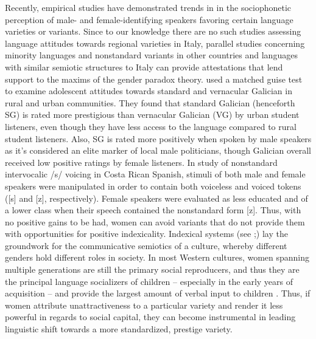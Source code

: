 \documentclass[output=paper,colorlinks,citecolor=brown]{langscibook}
\begin{document}
\par Recently, empirical studies have demonstrated trends in in the sociophonetic perception of male- and female-identifying speakers favoring certain language varieties or variants. Since to our knowledge there are no such studies assessing language attitudes towards regional varieties in Italy, parallel studies concerning minority languages and nonstandard variants in other countries and languages with similar semiotic structures to Italy can provide attestations that lend support to the maxims of the gender paradox theory. \cite{lour13} used a matched guise test to examine adolescent attitudes towards standard and vernacular Galician in rural and urban communities. They found that standard Galician (henceforth SG) is rated more prestigious than vernacular Galician (VG) by urban student listeners, even though they have less access to the language compared to rural student listeners. Also, SG is rated more positively when spoken by male speakers as it’s considered an elite marker of local male politicians, though Galician overall received low positive ratings by female listeners. In \cite{chap16} study of nonstandard intervocalic /s/ voicing in Costa Rican Spanish, stimuli of both male and female speakers were manipulated in order to contain both voiceless and voiced tokens ([s] and [z], respectively). Female speakers were evaluated as less educated and of a lower class when their speech contained the nonstandard form [z]. Thus, with no positive gains to be had, women can avoid variants that do not provide them with opportunities for positive indexicality. Indexical systems (see \cite{silv03};\cite{ecke08}) lay the groundwork for the communicative semiotics of a culture, whereby different genders hold different roles in society. In most Western cultures, women spanning multiple generations are still the primary social reproducers, and thus they are the principal language socializers of children – especially in the early years of acquisition – and provide the largest amount of verbal input to children \citep{pere03}. Thus, if women attribute unattractiveness to a particular variety \cite{cava06} and render it less powerful in regards to social capital, they can become instrumental in leading linguistic shift towards a more standardized, prestige variety.
\end{document}
